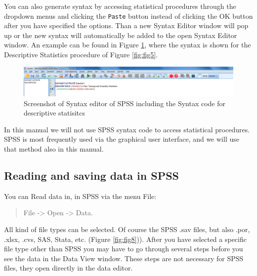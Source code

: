\documentclass[]{book}
\begin{document}
You can also generate syntax by accessing statistical procedures through
the dropdown menus and clicking the \texttt{Paste} button instead of
clicking the OK button after you have specified the options. Than a new
Syntax Editor window will pop up or the new syntax will automatically be
added to the open Syntax Editor window. An example can be found in
Figure \ref{fig:fig7}, where the syntax is shown for the Descriptive
Statistics procedure of Figure \ref{fig:fig5}.

\begin{figure}

{\centering \includegraphics[width=0.95\linewidth]{images/fig1.7} 

}

\caption{Screenshot of Syntax editor of SPSS including the Syntax code for descriptive statisitcs}\label{fig:fig7}
\end{figure}

In this manual we will not use SPSS syntax code to access statistical
procedures. SPSS is most frequently used via the graphical user
interface, and we will use that method also in this manual.

\subsection{Reading and saving data in
SPSS}\label{reading-and-saving-data-in-spss}

You can Read data in, in SPSS via the menu File:

\begin{quote}
File -\textgreater{} Open -\textgreater{} Data.
\end{quote}

All kind of file types can be selected. Of course the SPSS .sav files,
but also .por, .xlsx, .cvs, SAS, Stata, etc. (Figure \ref{fig:fig8})).
After you have selected a specific file type other than SPSS you may
have to go through several steps before you see the data in the Data
View window. These steps are not necessary for SPSS files, they open
directly in the data editor.
\end{document}
